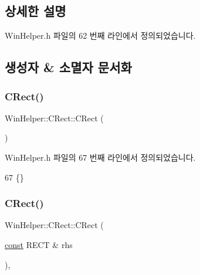 \subsection{상세한 설명}


Win\+Helper.\+h 파일의 62 번째 라인에서 정의되었습니다.



\subsection{생성자 \& 소멸자 문서화}
\mbox{\label{class_win_helper_1_1_c_rect_a23555d57c6d6f65272f0bc64378651b8}} 
\subsubsection{\texorpdfstring{C\+Rect()}{CRect()}\hspace{0.1cm}{\footnotesize\ttfamily [1/3]}}
{\footnotesize\ttfamily Win\+Helper\+::\+C\+Rect\+::\+C\+Rect (\begin{DoxyParamCaption}{ }\end{DoxyParamCaption})\hspace{0.3cm}{\ttfamily [inline]}}



Win\+Helper.\+h 파일의 67 번째 라인에서 정의되었습니다.


\begin{DoxyCode}
67 \{\}
\end{DoxyCode}
\mbox{\label{class_win_helper_1_1_c_rect_aae968ffaab6da35e85e7fa0e8941aea7}} 
\subsubsection{\texorpdfstring{C\+Rect()}{CRect()}\hspace{0.1cm}{\footnotesize\ttfamily [2/3]}}
{\footnotesize\ttfamily Win\+Helper\+::\+C\+Rect\+::\+C\+Rect (\begin{DoxyParamCaption}\item[{\mbox{\hyperlink{getopt1_8c_a2c212835823e3c54a8ab6d95c652660e}{const}} R\+E\+CT \&}]{rhs }\end{DoxyParamCaption})\hspace{0.3cm}{\ttfamily [inline]}, {\ttfamily [explicit]}}



